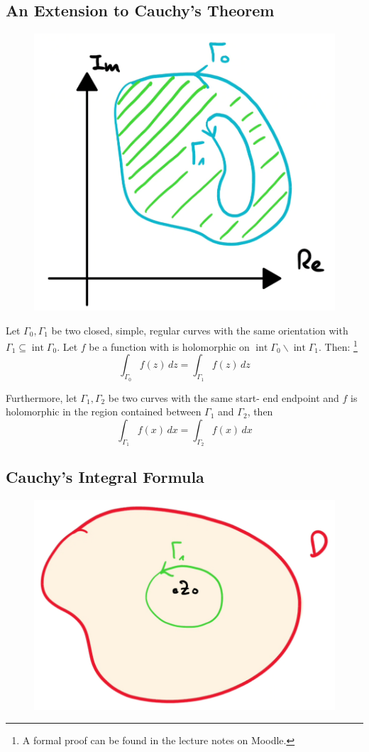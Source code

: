 \subsection{An Extension to Cauchy's Theorem}
\begin{figure}[H]
	\centering
	\includegraphics[width=0.4\linewidth]{Sketches/CauchysTheoremExtended}
	
	\label{fig:cauchystheoremextended}
\end{figure}


Let $\Gamma_0, \Gamma_1$ be two closed, simple, regular curves with the same orientation with $\Gamma_1\subseteq \operatorname{int} \Gamma_0$.
Let $f$ be a function with is holomorphic on $\operatorname{int} \Gamma_0\backslash \operatorname{int}\Gamma_1$.
Then: \footnote{A formal proof can be found in the lecture notes on Moodle.}
\begin{equation*}
	\boxed{\int_{\Gamma_0} f(z)\,dz = \int_{\Gamma_1} f(z)\,dz}
\end{equation*}

Furthermore, let $\Gamma_1,\Gamma_2$ be two curves with the same start- end endpoint and $f$ is holomorphic in the region contained between $\Gamma_1$ and $\Gamma_2$, then 
\begin{equation*}
	\int_{\Gamma_1} f(x)\,dx = \int_{\Gamma_2} f(x)\,dx
\end{equation*}

\subsection{Cauchy's Integral Formula}
\begin{figure}[H]
\begin{center}
	\includegraphics[width=0.3\linewidth]{Sketches/CauchyIntegralFormulas}
\end{center}
\end{figure}


